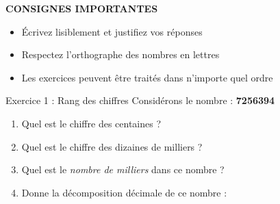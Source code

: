 

\begin{center}
  \quad
  \quad
  \quad
  \quad
\end{center}

\vspace{0.2cm}
\begin{consignebox}
   \textbf{CONSIGNES IMPORTANTES}
  \begin{itemize}[leftmargin=*,noitemsep,topsep=5pt]
    \item[\faIcon{check}] Écrivez lisiblement et justifiez vos réponses
    \item[\faIcon{check}] Respectez l'orthographe des nombres en lettres
    \item[\faIcon{check}] Les exercices peuvent être traités dans n'importe quel ordre
  \end{itemize}
\end{consignebox}

\vspace{0.5cm}
\begin{exercisebox}{ Exercice 1 : Rang des chiffres }
  Considérons le nombre : \textbf{\num{7256394}}

  \begin{enumerate}[label=\textcolor{primary}{\textbf{\alph*)}},leftmargin=*]
    \item Quel est le chiffre des centaines ?  
    \item Quel est le chiffre des dizaines de milliers ?  
    \item Quel est le \emph{nombre de milliers} dans ce nombre ?  
    \item Donne la décomposition décimale de ce nombre : 
  \end{enumerate}
\end{exercisebox}

